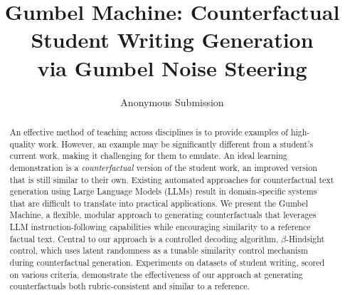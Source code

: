 \documentclass[letterpaper]{article} %
\title{Gumbel Machine: Counterfactual Student Writing Generation\\via Gumbel Noise Steering}
\author{
    Anonymous Submission
}
\begin{document}
\maketitle
\begin{abstract}
An effective method of teaching across disciplines is to provide examples of high-quality work.
However, an example may be significantly different from a student's current work, making it challenging for them to emulate. An ideal learning demonstration is a \textit{counterfactual} version of the student work, an improved version that is still similar to their own.
Existing automated approaches for counterfactual text generation using Large Language Models (LLMs) result in domain-specific systems that are difficult to translate into practical applications.
We present the Gumbel Machine, a flexible, modular approach to generating counterfactuals that leverages LLM instruction-following capabilities while encouraging similarity to a reference factual text.  
Central to our approach is a controlled decoding algorithm, $\beta$-Hindsight control, which uses latent randomness as a tunable similarity control mechanism during counterfactual generation.
Experiments on datasets of student writing, scored on various criteria, demonstrate the effectiveness of our approach at generating counterfactuals both rubric-consistent and similar to a reference.



\end{abstract}
\end{document}
